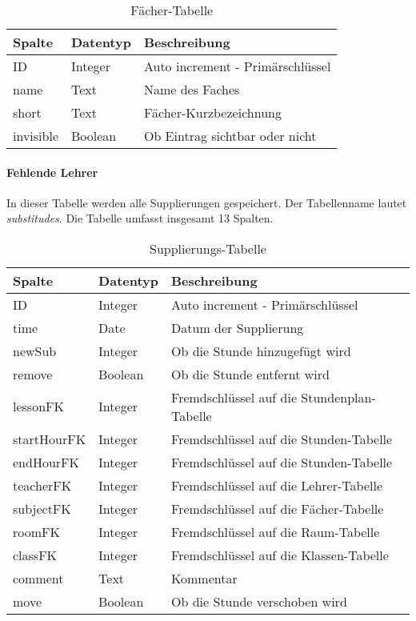 \begin{table}[H]
\centering
\begin{tabular}{p{2.5 cm}p{2.5 cm}p{10 cm}}
   \toprule
   \textbf{Spalte} & \textbf{Datentyp} & \textbf{Beschreibung} \\
   \midrule
          ID & Integer & Auto increment - Primärschlüssel  \\
          \hline
          name & Text & Name des Faches   \\
          \hline
	      short & Text & Fächer-Kurzbezeichnung   \\
	      \hline
          invisible & Boolean & Ob Eintrag sichtbar oder nicht   \\
   \bottomrule
\end{tabular}
\caption{Fächer-Tabelle}
\end{table}

\paragraph{Fehlende Lehrer\\}
In dieser Tabelle werden alle Supplierungen gespeichert. Der Tabellenname lautet \textit{substitudes}. Die Tabelle umfasst insgesamt 13 Spalten.

\begin{table}[H]
\centering
\begin{tabular}{p{2.5 cm}p{2.5 cm}p{10 cm}}
   \toprule
   \textbf{Spalte} & \textbf{Datentyp} & \textbf{Beschreibung} \\
   \midrule
          ID & Integer & Auto increment - Primärschlüssel  \\
          \hline
          time & Date & Datum der Supplierung   \\
          \hline
	      newSub & Integer & Ob die Stunde hinzugefügt wird  \\
	      \hline
          remove & Boolean & Ob die Stunde entfernt wird   \\
          \hline
          lessonFK & Integer & Fremdschlüssel auf die Stundenplan-Tabelle    \\
          \hline
          startHourFK & Integer & Fremdschlüssel auf die Stunden-Tabelle   \\
          \hline
          endHourFK & Integer & Fremdschlüssel auf die Stunden-Tabelle   \\
          \hline
	      teacherFK & Integer & Fremdschlüssel auf die Lehrer-Tabelle \\
	      \hline
          subjectFK & Integer & Fremdschlüssel auf die Fächer-Tabelle   \\
          \hline
          roomFK & Integer & Fremdschlüssel auf die Raum-Tabelle \\
          \hline
          classFK & Integer & Fremdschlüssel auf die Klassen-Tabelle \\
          \hline    
          comment & Text & Kommentar \\
          \hline                 	      
          move & Boolean & Ob die Stunde verschoben wird  \\
   \bottomrule
\end{tabular}
\caption{Supplierungs-Tabelle}
\end{table}

